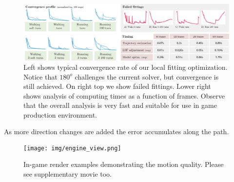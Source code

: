 

\begin{figure}
    \centering
    \includegraphics[width=1.0\columnwidth]{img/stats.png}
    \caption{Left shows typical convergence rate of our local fitting optimization. Notice that $180^o$ challenges the current solver, but convergence is still achieved. On right top we show failed fittings. Lower right shows analysis of computing times as a function of frames. Observe that the overall analysis is very fast and suitable for use in game production environment.}
    \label{fig:results:stats}
\end{figure}

As more direction changes are added the error accumulates along the path.
\begin{figure}
    \centering
    \texttt{[image: img/engine\_view.png]}
    \caption{In-game render examples demonstrating the motion quality. Please see supplementary movie too.}
    \label{fig:results:engine_view}
\end{figure}


